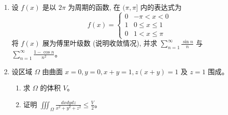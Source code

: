 \begin{enumerate}
\begin{enumerate}
\item
设 $f(x)$ 是以 $2 \pi$ 为周期的函数, 在 $(\pi, \pi]$ 内的表达式为	
\[
f(x)=\left\{\begin{array}{ll}
	0 & -\pi<x<0 \\
	1 & 0 \leqslant x \leqslant 1 \\
	0 & 1<x \leqslant \pi
\end{array}\right.
\]	
将 $f(x)$ 展为傅里叶级数 (说明收敛情况), 并求 $\sum\limits_{n=1}^{\infty} \frac{\sin n}{n}$ 与 $\sum\limits_{n=1}^{\infty} \frac{1-\cos n}{n^{2}}$。 

\item
设区域 $\Omega$ 由曲面 $x=0, y=0, x+y=1, z(x+y)=1$ 及 $z=1$ 围成。
\begin{enumerate}
	\item
求 $\Omega$ 的体积 $V$。
\item 
证明 $\iiint_{\Omega} \frac{d x d y d z}{x^{2}+y^{2}+z^{2}} \leqslant \frac{V}{2}$。
	
	
	
\end{enumerate}




	
\end{enumerate}

\banswer{
	
}


	
\end{enumerate}


